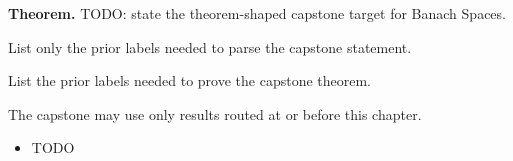 \label{cap:banach-spaces}

\begin{tcolorbox}[
  colback=gray!6,
  colframe=gray!40,
  arc=2pt,
  left=8pt, right=8pt, top=6pt, bottom=6pt,
  title={\small\textbf{Capstone Theorem}},
  fonttitle=\small\bfseries
]
\textbf{Theorem.}
TODO: state the theorem-shaped capstone target for Banach Spaces.
\end{tcolorbox}

\begin{remark*}
List only the prior labels needed to parse the capstone statement.
\end{remark*}

\begin{remark*}
List the prior labels needed to prove the capstone theorem.
\end{remark*}

\begin{remark*}
The capstone may use only results routed at or before this chapter.
\end{remark*}

\begin{dependencies}
\begin{itemize}
  \item TODO
\end{itemize}
\end{dependencies}

\clearpage
